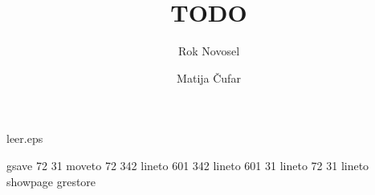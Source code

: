 \begin{filecontents}{leer.eps}

gsave
72 31 moveto
72 342 lineto
601 342 lineto
601 31 lineto
72 31 lineto
showpage
grestore
\end{filecontents}
%
\documentclass[epj]{svjour}
%
\usepackage{graphicx}
%

%
\title{TODO}
\author{Rok Novosel \and Matija \v{C}ufar
}                     %
%
%
%
%
%
\maketitle

\section{Introduction}
\label{sec:intro}



\section{Network Structure}
\label{sec:structure}

In this article, we will analyse a metabolic network of the Chinese hamster
ovary (CHO) cell. The CHO cell is frequently used in biological and medical
research and in the production of biopharmaceuticals\cite{chocons}.

We have used a whole-cell metabolic network of the Chinese hamster ovary (CHO)
cell that was taken from the BiGG database\cite{bigg,chocons}. The original
network contains 4,456 metabolites that take part in 6,663 reactions. The
reactions and metabolites are annotated with additional metadata, such as name,
BiGG ID, subsystem etc.


